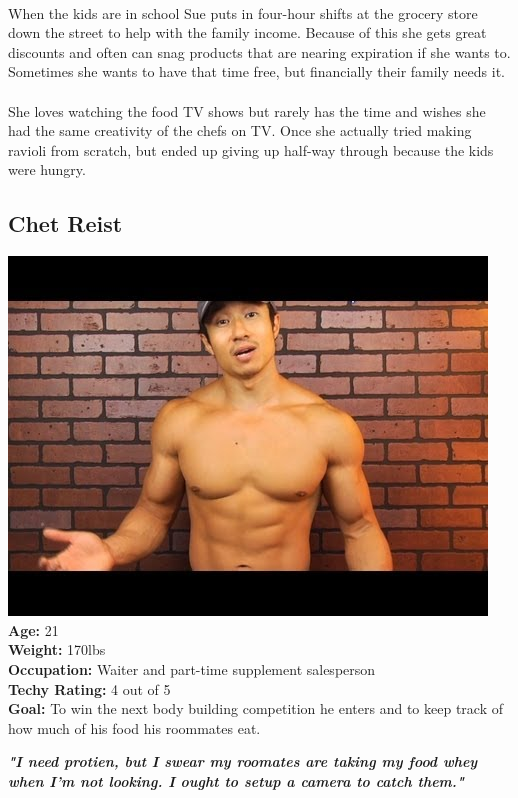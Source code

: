 \documentclass[a4paper,12pt]{article}
\begin{document}
\begin{appendices}
\\
When the kids are in school Sue puts in four-hour shifts at the grocery store down the street to help with the family income.  Because of this she gets great discounts and often can snag products that are nearing expiration if she wants to.  Sometimes she wants to have that time free, but financially their family needs it.\\
\\
She loves watching the food TV shows but rarely has the time and wishes she had the same creativity of the chefs on TV.  Once she actually tried making ravioli from scratch, but ended up giving up half-way through because the kids were hungry.\\
\newpage
\subsection{Chet Reist}
\includegraphics[scale=0.38]{Chet.jpg}\\
\textbf{Age:} 21\\
\textbf{Weight:} 170lbs\\
\textbf{Occupation:} Waiter and part-time supplement salesperson\\
\textbf{Techy Rating:} 4 out of 5\\
\textbf{Goal:} To win the next body building competition he enters and to keep track of how much of his food his roommates eat.\\
\begin{large}
\textbf{\textit{"I need protien, but I swear my roomates are taking my food whey when I'm not looking.  I ought to setup a camera to catch them."}}
\end{large}\\\\

\end{appendices}
\end{document}

